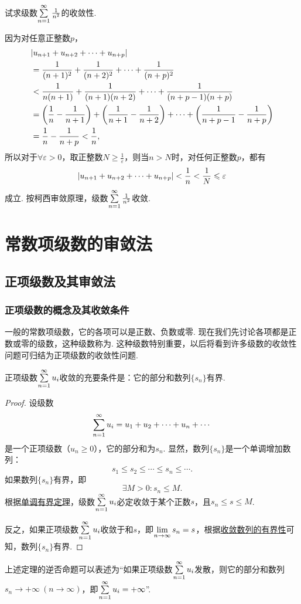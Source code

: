 \begin{example}
试求级数\(\sum\limits_{n=1}^{\infty} \frac{1}{n^2}\)的收敛性.
\begin{solution}
因为对任意正整数\(p\)，\begin{align*}
&\abs{u_{n+1}+u_{n+2}+\dotsb+u_{n+p}} \\
&=\frac{1}{(n+1)^2}+\frac{1}{(n+2)^2}+\dotsb+\frac{1}{(n+p)^2} \\
&<\frac{1}{n(n+1)}+\frac{1}{(n+1)(n+2)}+\dotsb+\frac{1}{(n+p-1)(n+p)} \\
&=\left(\frac{1}{n}-\frac{1}{n+1}\right)+\left(\frac{1}{n+1}-\frac{1}{n+2}\right)+\dotsb+\left(\frac{1}{n+p-1}-\frac{1}{n+p}\right) \\
&=\frac{1}{n}-\frac{1}{n+p} < \frac{1}{n},
\end{align*}
所以对于\(\forall \varepsilon > 0\)，取正整数\(N \geqslant \frac{1}{\varepsilon}\)，则当\(n > N\)时，对任何正整数\(p\)，都有\[
\abs{u_{n+1}+u_{n+2}+\dotsb+u_{n+p}}
< \frac{1}{n}
< \frac{1}{N}
\leqslant \varepsilon
\]成立.
按柯西审敛原理，级数\(\sum\limits_{n=1}^{\infty} \frac{1}{n^2}\)收敛.
\end{solution}
\end{example}

\section{常数项级数的审敛法}
\subsection{正项级数及其审敛法}
\subsubsection{正项级数的概念及其收敛条件}
一般的常数项级数，它的各项可以是正数、负数或零.
现在我们先讨论各项都是正数或零的级数，这种级数称为.
这种级数特别重要，以后将看到许多级数的收敛性问题可归结为正项级数的收敛性问题.

\begin{theorem}\label{theorem:无穷级数.正项级数收敛的充要条件1}
正项级数\(\sum\limits_{n=1}^{\infty} u_i\)收敛的充要条件是：它的部分和数列\(\{s_n\}\)有界.
\begin{proof}
设级数\[
\sum\limits_{n=1}^{\infty} u_i = u_1 + u_2 + \dotsb + u_n + \dotsb
\]是一个正项级数（\(u_n \geqslant 0\)），它的部分和为\(s_n\).
显然，数列\(\{s_n\}\)是一个单调增加数列：\[
s_1 \leqslant s_2 \leqslant \dotsb \leqslant s_n \leqslant \dotsb.
\]如果数列\(\{s_n\}\)有界，即\[
\exists M>0 : s_n \leqslant M.
\]根据\hyperref[theorem:极限.数列的单调有界定理]{单调有界定理}，级数\(\sum\limits_{n=1}^{\infty} u_i\)必定收敛于某个正数\(s\)，且\(s_n \leqslant s \leqslant M\).

反之，如果正项级数\(\sum\limits_{n=1}^{\infty} u_i\)收敛于和\(s\)，即\(\lim\limits_{n\to\infty} s_n = s\)，根据\hyperref[theorem:极限.收敛数列的有界性]{收敛数列的有界性}可知，数列\(\{s_n\}\)有界.
\end{proof}
\end{theorem}
上述定理的逆否命题可以表述为“如果正项级数\(\sum\limits_{n=1}^{\infty} u_i\)发散，则它的部分和数列\(s_n \to +\infty\ (n\to\infty)\)，即\(\sum\limits_{n=1}^{\infty} u_i = +\infty\)”.


